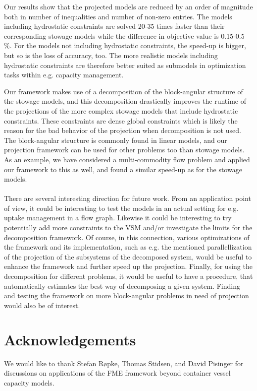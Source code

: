Our results show that the projected models are reduced by an order of magnitude both in number of inequalities and number of non-zero entries. The models including hydrostatic constraints are solved 20-35 times faster than their corresponding stowage models while the difference in objective value is 0.15-0.5 \%. For the models not including hydrostatic constraints, the speed-up is bigger, but so is the loss of accuracy, too. The more realistic models including hydrostatic constraints are therefore better suited as submodels in optimization tasks within e.g. capacity management. 

Our framework makes use of a decomposition of the block-angular structure of the stowage models, and this decomposition drastically improves the runtime of the projections of the more complex stowage models that include hydrostatic constraints. These constraints are dense global constraints which is likely the reason for the bad behavior of the projection when decomposition is not used.
The block-angular structure is commonly found in linear models, and our projection framework can be used for other problems too than stowage models. As an example, we have considered a multi-commodity flow problem and applied our framework to this as well, and found a similar speed-up as for the stowage models. 
\\\\
{There are several interesting direction for future work. 
From an application point of view, it could be interesting to test the models in an actual setting for e.g. uptake management in a flow graph.
Likewise it could be interesting to try potentially add more constraints to the VSM and/or investigate the limits for the decomposition framework. Of course, in this connection, various optimizations of the framework and its implementation, such as e.g. the mentioned parallellization of the projection of the subsystems of the decomposed system, would be useful to enhance the framework and further speed up the projection.
Finally, for using the decomposition for different problems, it would be useful to have a procedure, that automatically estimates the best way of decomposing a given system. Finding and testing the framework on more block-angular problems in need of projection would also be of interest.} 

\section*{Acknowledgements}
We would like to thank Stefan R{\o}pke, Thomas Stidsen, and David Pisinger for discussions on applications of the FME framework beyond container vessel capacity models. 


